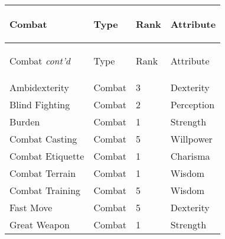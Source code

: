 \documentclass[twoside]{book}
\begin{document}
\begin{longtable}{p{1.25in}lll} 
  Combat
  &
  \begin{turn}{70}{Type}\end{turn}
          
  &
  \begin{turn}{70}{Rank}\end{turn}
          
  &
  \begin{turn}{70}{Attribute}\end{turn}
          
  \\
  \hline
  \hline
  \endfirsthead
  Combat \textit{cont'd}
        
  &
  \begin{turn}{70}{Type}\end{turn}
          
  &
  \begin{turn}{70}{Rank}\end{turn}
          
  &
  \begin{turn}{70}{Attribute}\end{turn}
          
  \\
  \hline
  \endhead
      
  \raggedright
           Ambidexterity 
  &
   Combat 
  &
   3 
  &
   Dexterity 
  \tabularnewline
      
  \raggedright
           Blind Fighting 
  &
   Combat 
  &
   2 
  &
   Perception 
  \tabularnewline
      
  \raggedright
           Burden 
  &
   Combat 
  &
   1 
  &
   Strength 
  \tabularnewline
      
  \raggedright
           Combat Casting 
  &
   Combat 
  &
   5 
  &
   Willpower 
  \tabularnewline
      
  \raggedright
           Combat Etiquette 
  &
   Combat 
  &
   1 
  &
   Charisma 
  \tabularnewline
      
  \raggedright
           Combat Terrain 
  &
   Combat 
  &
   1 
  &
   Wisdom 
  \tabularnewline
      
  \raggedright
           Combat Training 
  &
   Combat 
  &
   5 
  &
   Wisdom 
  \tabularnewline
      
  \raggedright
           Fast Move 
  &
   Combat 
  &
   5 
  &
   Dexterity 
  \tabularnewline
      
  \raggedright
           Great Weapon 
  &
   Combat 
  &
   1 
  &
   Strength 
  \tabularnewline
      

\end{longtable}
\end{document}

